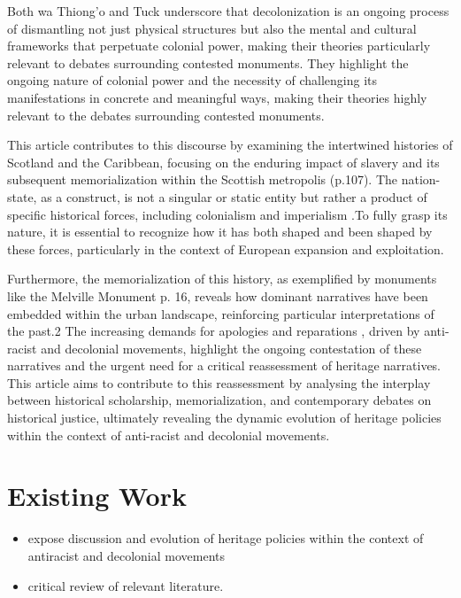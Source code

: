 \documentclass{scrartcl}
\begin{document}
Both wa Thiong'o  and Tuck underscore that decolonization is an ongoing process of dismantling not just physical structures but also the mental and cultural frameworks that perpetuate colonial power, making their theories particularly relevant to debates surrounding contested monuments. They highlight the ongoing nature of colonial power and the necessity of challenging its manifestations in concrete and meaningful ways, making their theories highly relevant to the debates surrounding contested monuments.  

This article contributes to this discourse by examining the intertwined histories of Scotland and the Caribbean, focusing on the enduring impact of slavery and its subsequent memorialization within the Scottish metropolis (p.107).\cite{godard_2018} 
The nation-state, as a construct, is not a singular or static entity but rather a product of specific historical forces, including colonialism and imperialism .To fully grasp its nature, it is essential to recognize how it has both shaped and been shaped by these forces, particularly in the context of European expansion and exploitation.

Furthermore, the memorialization of this history, as exemplified by monuments like the Melville Monument \cite{godard_2018}{p. 16}, reveals how dominant narratives have been embedded within the urban landscape, reinforcing particular interpretations of the past.2 The increasing demands for apologies and reparations \cite{hartel_2024}, driven by anti-racist and decolonial movements, highlight the ongoing contestation of these narratives and the urgent need for a critical reassessment of heritage narratives. This article aims to contribute to this reassessment by analysing the interplay between historical scholarship, memorialization, and contemporary debates on historical justice, ultimately revealing the dynamic evolution of heritage policies within the context of anti-racist and decolonial movements.

\section{Existing Work}

\begin{itemize}
    \item expose discussion and evolution of heritage policies within the context of antiracist and decolonial movements
    \item critical review of relevant literature.
\end{itemize}
\end{document}

